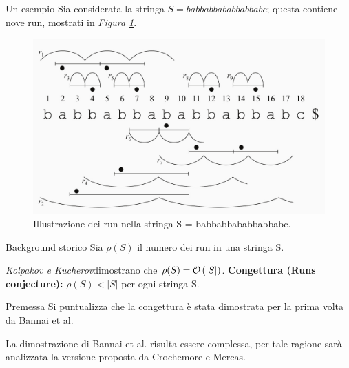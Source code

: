\documentclass{beamer}
\begin{document}
    \begin{frame}{Un esempio}
        Sia considerata la stringa \(S = babbabbababbabbabc\); questa contiene nove 
        run, mostrati in \emph{Figura \ref{fig:1}}.

        \begin{figure}[!h]
            \centering
            \includegraphics[scale = .85]{../Extra/run example.jpg}
            \caption{Illustrazione dei run nella stringa S = babbabbababbabbabc.}
            \label{fig:1}
        \end{figure}
    \end{frame}
    \begin{frame}{Background storico}
        Sia \(\rho(S)\) il numero dei run in una stringa S.

        \emph{Kolpakov \emph{e} Kucherov}\footnotemark[1]
        dimostrano che \(\rho(S) = \mathcal{O} \left\lparen |S| \right\rparen\).
        \vskip 10pt
        \textbf{Congettura (Runs conjecture):} \(\rho (S) < |S|\) per ogni stringa S.

    \end{frame}
    \begin{frame}{Premessa}
        Si puntualizza che la congettura è stata dimostrata per la prima 
        volta da Bannai et al.\footnotemark[2]
        
        La dimostrazione di Bannai et al. risulta essere complessa,
        per tale ragione sarà analizzata la versione proposta da Crochemore e Mercas.\footnotemark[3]


    \end{frame}
\end{document}
